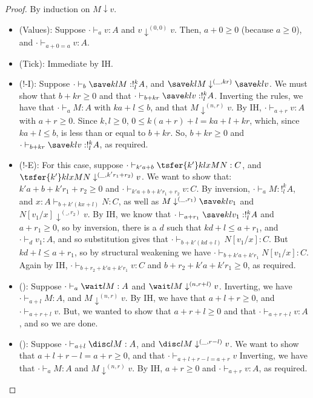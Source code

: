 \pres*
\begin{proof}
By induction on $M \downarrow v$.
\begin{itemize}
\item (Values): Suppose $\cdot \vdash_a v : A$ and $v \downarrow^{(0,0)} v$. Then, $a + 0 \geq 0$ (because $a \geq 0$), and $\cdot \vdash_{a+0 = a} v : A$.
\item (Tick): Immediate by IH.

\item ($!$-I):  Suppose $\cdot \vdash_b \save k l M : !^k_l A$, and $\save k l M \downarrow^{(\_,kr)} \save k l v$. We must show that $b + kr \geq 0$ and that $\cdot \vdash_{b+kr} \save k l v : !^k_l A$. Inverting the rules, we have that $\cdot \vdash_a M : A$ with $ka+l \leq b$, and that $M \downarrow^{(n,r)} v$. By IH, $\cdot \vdash_{a+r} v : A$ with $a + r \geq 0$. Since $k,l \geq 0$, $0 \leq k(a+r) + l = ka+l+kr$, which, since $ka+l \leq b$, is less than or equal to $b+kr$. So, $b+kr \geq 0$ and $\cdot \vdash_{b+kr} \save k l v : !^k_l A$, as required.

\item ($!$-E): For this case, suppose $\cdot \vdash_{k'a+b} \tsfer {k'} k l x M N : C$, and  $\tsfer{k'} k l x M N \downarrow^{(\_,k'r_1+r_2)} v$. We want to show that: $k'a + b + k'r_1 + r_2 \geq 0$ and $\cdot \vdash_{k'a + b + k'r_1 + r_2} v : C$. By inversion, $\cdot \vdash_a M : !^k_l A$, and $x : A \vdash_{b+k'(kx+l)} N :C$, as well as $M \downarrow^{(\_,r_1)} \save k l {v_1}$ and $N[v_1/x] \downarrow^{(\_,r_2)} v$. By IH, we know that $\cdot \vdash_{a+r_1} \save k l {v_1} : !^k_l A$ and $a+r_1 \geq 0$, so by inversion, there is a $d$ such that $kd+l \leq a+r_1$, and $\cdot \vdash_d v_1 : A$, and so substitution gives that $\cdot \vdash_{b+k'(kd+l)} N[v_1/x] : C$. But $kd+l \leq a+r_1$, so by structural weakening we have $\cdot \vdash_{b+k'a+k'r_1} N[v_1/x] : C$. Again by IH, $\cdot \vdash_{b+r_2 + k'a+k'r_1} v : C$ and $b+r_2 + k'a+k'r_1 \geq 0$, as required.

\item (\waitname): Suppose $\cdot \vdash_a \wait l M : A$ and $\wait l M \downarrow^{(n,r+l)} v$. Inverting, we have $\cdot \vdash_{a+l} M : A$, and $M \downarrow^{(n,r)} v$. By IH, we have that $a + l + r \geq 0$, and $\cdot \vdash_{a+r+l} v$. But, we wanted to show that $a + r + l \geq 0$ and that $\cdot \vdash_{a + r + l} v : A$, and so we are done.
\item (\discname): Suppose $\cdot \vdash_{a+l} \disc l M : A$, and $\disc l M \downarrow^{(\_,r-l)} v$. We want to show that $a + l + r - l = a + r \geq 0$, and that $\cdot \vdash_{a+l+r-l=a+r} v$ Inverting, we have that $\cdot \vdash_a M : A$ and $M \downarrow^{(n,r)} v$. By IH, $a + r \geq 0$ and $\cdot \vdash_{a+r} v : A$, as required.


\end{itemize}
\end{proof}
